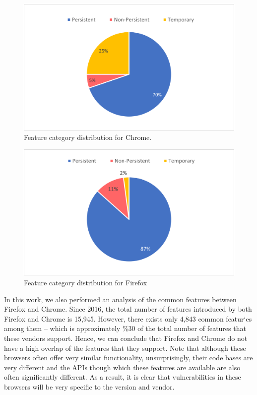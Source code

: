 \begin{figure}[ht]
    \centering
    \includegraphics[width=\columnwidth]{figures/chrome-feature-categories.png}
    \caption{Feature category distribution for Chrome.}
    \label{fig:chrome-categories}
\end{figure}

\begin{figure}[ht]
    \centering
    \includegraphics[width=\columnwidth]{figures/firefox-feature-categories.png}
    \caption{Feature category distribution for Firefox}
    \label{fig:firefox-categories}
  \end{figure}

  In this work, we also performed an analysis of the common features
  between Firefox and Chrome. Since 2016, the total number of features
  introduced by both Firefox and Chrome is 15,945. However, there
  exists only 4,843 common featur`es among them -- which is
  approximately \%30 of the total number of features that these
  vendors support. Hence, we can conclude that Firefox and Chrome do
  not have a high overlap of the features that they support. Note that
  although these browsers often offer very similar functionality,
  unsurprisingly, their code bases are very different and the APIs
  though which these features are available are also often
  significantly different. As a result, it is clear that
  vulnerabilities in these browsers will be very specific to the
  version and vendor.

